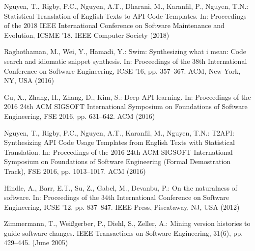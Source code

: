 \documentclass[runningheads]{llncs}
\begin{document}
\begin{thebibliography}{8}
    Nguyen, T., Rigby, P.C., Nguyen, A.T., Dharani, M., Karanfil, P., Nguyen, T.N.: Statistical Translation of English Texts to API Code Templates. In: Proceedings of the 2018 IEEE International Conference on Software Maintenance and Evolution, ICSME ’18. IEEE Computer Society (2018)
    
    Raghothaman, M., Wei, Y., Hamadi, Y.: Swim: Synthesizing what i mean: Code search and idiomatic snippet synthesis. In: Proceedings of the 38th International Conference on Software Engineering, ICSE ’16, pp. 357--367. ACM, New York, NY, USA (2016)
    
    Gu, X., Zhang, H., Zhang, D., Kim, S.: Deep API learning. In: Proceedings of the 2016 24th ACM SIGSOFT International Symposium on Foundations of Software Engineering, FSE 2016, pp. 631--642. ACM (2016)
    
    Nguyen, T., Rigby, P.C., Nguyen, A.T., Karanfil, M., Nguyen, T.N.: T2API: Synthesizing API Code Usage Templates from English Texts with Statistical Translation. In: Proceedings of the 2016 24th ACM SIGSOFT International Symposium on Foundations of Software Engineering (Formal Demostration Track), FSE 2016, pp. 1013--1017. ACM (2016)
    
    Hindle, A., Barr, E.T., Su, Z., Gabel, M., Devanbu, P.: On the naturalness of software. In: Proceedings of the 34th International Conference on Software Engineering, ICSE ’12, pp. 837--847. IEEE Press, Piscataway, NJ, USA (2012)

    Zimmermann, T., Weißgerber, P., Diehl, S., Zeller, A.: Mining version histories to guide software changes. IEEE Transactions on Software Engineering, 31(6), pp. 429--445. (June 2005)




\end{thebibliography}
\end{document}
